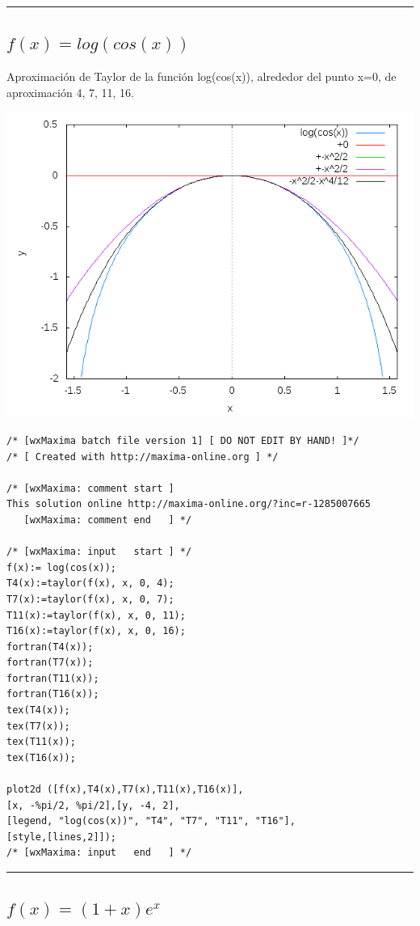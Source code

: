 \documentclass{article}
\begin{document}
\noindent\rule{\textwidth}{1pt}



\subsection{$f(x)= log(cos(x))$}

Aproximaci\'on de Taylor de la funci\'on log(cos(x)), alrededor del punto  x=0, de aproximaci\'on 4, 7, 11, 16.


\includegraphics[scale=.5]{Log(cos(x))}

\begin{Verbatim}[frame=single]
/* [wxMaxima batch file version 1] [ DO NOT EDIT BY HAND! ]*/
/* [ Created with http://maxima-online.org ] */

/* [wxMaxima: comment start ]
This solution online http://maxima-online.org/?inc=r-1285007665
   [wxMaxima: comment end   ] */

/* [wxMaxima: input   start ] */
f(x):= log(cos(x));
T4(x):=taylor(f(x), x, 0, 4);
T7(x):=taylor(f(x), x, 0, 7);
T11(x):=taylor(f(x), x, 0, 11);
T16(x):=taylor(f(x), x, 0, 16);
fortran(T4(x));
fortran(T7(x));
fortran(T11(x));
fortran(T16(x));
tex(T4(x));
tex(T7(x));
tex(T11(x));
tex(T16(x));

plot2d ([f(x),T4(x),T7(x),T11(x),T16(x)],
[x, -%pi/2, %pi/2],[y, -4, 2],
[legend, "log(cos(x))", "T4", "T7", "T11", "T16"],
[style,[lines,2]]);
/* [wxMaxima: input   end   ] */
\end{Verbatim}

\noindent\rule{\textwidth}{1pt}


\subsection{$f(x)= (1+x)e^x$}
\end{document}
